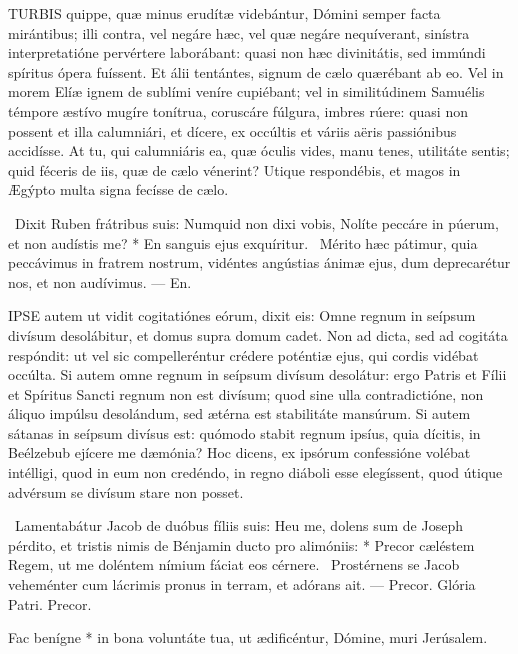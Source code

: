 
\lettrine[lines=2]{T}{URBIS} quippe, quæ minus erudítæ videbántur, Dómini semper facta mirántibus; illi contra, vel negáre hæc, vel quæ negáre nequíverant, sinístra interpretatióne pervértere laborábant: quasi non hæc divinitátis, sed immúndi spíritus ópera fuíssent. Et álii tentántes, signum de cælo quærébant ab eo. Vel in morem Elíæ ignem de sublími veníre cupiébant; vel in similitúdinem Samuélis témpore æstívo mugíre tonítrua, coruscáre fúlgura, imbres rúere: quasi non possent et illa calumniári, et dícere, ex occúltis et váriis aëris passiónibus accidísse. At tu, qui calumniáris ea, quæ óculis vides, manu tenes, utilitáte sentis; quid féceris de iis, quæ de cælo vénerint? Utique respondébis, et magos in Ægýpto multa signa fecísse de cælo.

\R\ Dixit Ruben frátribus suis: Numquid non dixi vobis, Nolíte peccáre in púerum, et non audístis me? * En sanguis ejus exquíritur. \V\ Mérito hæc pátimur, quia peccávimus in fratrem nostrum, vidéntes angústias ánimæ ejus, dum deprecarétur nos, et non audívimus. --- En.


\lettrine[lines=2]{I}{PSE} autem ut vidit cogitatiónes eórum, dixit eis: Omne regnum in seípsum divísum desolábitur, et domus supra domum cadet. Non ad dicta, sed ad cogitáta respóndit: ut vel sic compelleréntur crédere poténtiæ ejus, qui cordis vidébat occúlta. Si autem omne regnum in seípsum divísum desolátur: ergo Patris et Fílii et Spíritus Sancti regnum non est divísum; quod sine ulla contradictióne, non áliquo impúlsu desolándum, sed ætérna est stabilitáte mansúrum. Si autem sátanas in seípsum divísus est: quómodo stabit regnum ipsíus, quia dícitis, in Beélzebub ejícere me dæmónia? Hoc dicens, ex ipsórum confessióne volébat intélligi, quod in eum non credéndo, in regno diáboli esse elegíssent, quod útique advérsum se divísum stare non posset.

\R\ Lamentabátur Jacob de duóbus fíliis suis: Heu me, dolens sum de Joseph pérdito, et tristis nimis de Bénjamin ducto pro alimóniis: * Precor cæléstem Regem, ut me doléntem nímium fáciat eos cérnere. \V\ Prostérnens se Jacob veheménter cum lácrimis pronus in terram, et adórans ait. --- Precor. Glória Patri. Precor.


 Fac benígne * in bona voluntáte tua, ut ædificéntur, Dómine, muri Jerúsalem.


